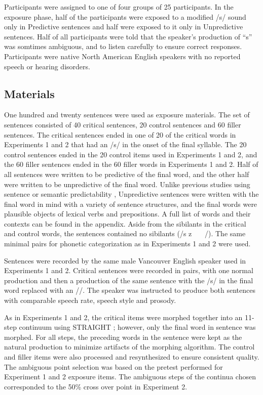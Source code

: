 Participants were assigned to one of four groups of 25 participants.  
In the exposure phase, half of the participants were exposed to a modified /s/ sound only in Predictive sentences and half were exposed to it only in Unpredictive sentences.  
Half of all participants were told that the speaker's production of ``s'' was somtimes ambiguous, and to listen carefully to ensure correct responses.  
Participants were native North American English speakers with no reported speech or hearing disorders.

\subsection{Materials}

One hundred and twenty sentences were used as exposure materials.  
The set of sentences consisted of 40 critical sentences, 20 control sentences and 60 filler sentences. 
The critical sentences ended in one of 20 of the critical words in Experiments 1 and 2 that had an /s/ in the onset of the final syllable.  
The 20 control sentences ended in the 20 control items used in Experiments 1 and 2, and the 60 filler sentences ended in the 60 filler words in Experiments 1 and 2.  
Half of all sentences were written to be predictive of the final word, and the other half were written to be unpredictive of the final word.  
Unlike previous studies using sentence or semantic predictability \citep{Kalikow1977}, Unpredictive sentences were written with the final word in mind with a variety of sentence structures, and the final words were plausible objects of lexical verbs and prepositions.  
A full list of words and their contexts can be found in the appendix. Aside from the sibilants in the critical and control words, the sentences contained no sibilants (/s z \textesh\ \textyogh\ \textteshlig\  \textdyoghlig/).  
The same minimal pairs for phonetic categorization as in Experiments 1 and 2 were used.

Sentences were recorded by the same male Vancouver English speaker used in Experiments 1 and 2.  
Critical sentences were recorded in pairs, with one normal production and then a production of the same sentence with the /s/ in the final word replaced with an /\textesh/.  
The speaker was instructed to produce both sentences with comparable speech rate, speech style and prosody.

As in Experiments 1 and 2, the critical items were morphed together into an 11-step continuum using STRAIGHT \citep{Kawahara2008}; however, only the final word in sentence was morphed.  
For all steps, the preceding words in the sentence were kept as the natural production to minimize artifacts of the morphing algorithm.  
The control and filler items were also processed and resynthesized to ensure consistent quality.  The ambiguous point selection was based on the pretest performed for Experiment 1 and 2 exposure items.  
The ambiguous steps of the continua chosen corresponded to the 50\% cross over point in Experiment 2.

